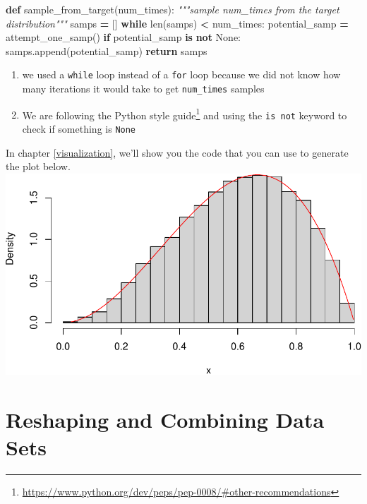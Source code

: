\documentclass[
  12pt,
]{krantz}
\makeatletter
\newenvironment{Shaded}{\begin{snugshade}}{\end{snugshade}}
\newcommand{\BuiltInTok}[1]{#1}
\newcommand{\CommentTok}[1]{\textcolor[rgb]{0.37,0.37,0.37}{\textit{#1}}}
\newcommand{\ControlFlowTok}[1]{\textcolor[rgb]{0.27,0.27,0.27}{\textbf{#1}}}
\newcommand{\KeywordTok}[1]{\textcolor[rgb]{0.27,0.27,0.27}{\textbf{#1}}}
\newcommand{\NormalTok}[1]{#1}
\newcommand{\OperatorTok}[1]{\textcolor[rgb]{0.43,0.43,0.43}{\textbf{#1}}}
\newcommand{\VariableTok}[1]{\textcolor[rgb]{0,0,0}{#1}}
\providecommand{\tightlist}{%
  \setlength{\itemsep}{0pt}\setlength{\parskip}{0pt}}
\renewcommand{\href}[2]{#2\footnote{\url{#1}}}
\newenvironment{kframe}{%
\medskip{}
\setlength{\fboxsep}{.8em}
 \def\at@end@of@kframe{}%
 \ifinner\ifhmode%
  \def\at@end@of@kframe{\end{minipage}}%
  \begin{minipage}{\columnwidth}%
 \fi\fi%
 \def\FrameCommand##1{\hskip\@totalleftmargin \hskip-\fboxsep
 \colorbox{shadecolor}{##1}\hskip-\fboxsep
     \hskip-\linewidth \hskip-\@totalleftmargin \hskip\columnwidth}%
 \MakeFramed {\advance\hsize-\width
   \@totalleftmargin\z@ \linewidth\hsize
   \@setminipage}}%
 {\par\unskip\endMakeFramed%
 \at@end@of@kframe}
\renewenvironment{Shaded}{\begin{kframe}}{\end{kframe}}
\makeatother
\begin{document}
\begin{Shaded}
\begin{Highlighting}[]
\KeywordTok{def}\NormalTok{ sample\_from\_target(num\_times):}
    \CommentTok{"""sample num\_times from the target distribution"""}
\NormalTok{    samps }\OperatorTok{=}\NormalTok{ []}
    \ControlFlowTok{while} \BuiltInTok{len}\NormalTok{(samps) }\OperatorTok{\textless{}}\NormalTok{ num\_times:}
\NormalTok{        potential\_samp }\OperatorTok{=}\NormalTok{ attempt\_one\_samp()}
        \ControlFlowTok{if}\NormalTok{ potential\_samp }\KeywordTok{is} \KeywordTok{not} \VariableTok{None}\NormalTok{:}
\NormalTok{            samps.append(potential\_samp)}
    \ControlFlowTok{return}\NormalTok{ samps}
\end{Highlighting}
\end{Shaded}

\begin{enumerate}
\def\labelenumi{\arabic{enumi}.}
\tightlist
\item
  we used a \texttt{while} loop instead of a \texttt{for} loop because we did not know how many iterations it would take to get \texttt{num\_times} samples
\item
  We are following the \href{https://www.python.org/dev/peps/pep-0008/\#other-recommendations}{Python style guide} and using the \texttt{is\ not} keyword to check if something is \texttt{None}
\end{enumerate}

In chapter \ref{visualization}, we'll show you the code that you can use to generate the plot below.
\includegraphics{r_and_python_book_files/figure-latex/unnamed-chunk-142-1.pdf}

\hypertarget{reshaping-and-combining-data-sets}{%
\chapter{Reshaping and Combining Data Sets}\label{reshaping-and-combining-data-sets}}
\end{document}

